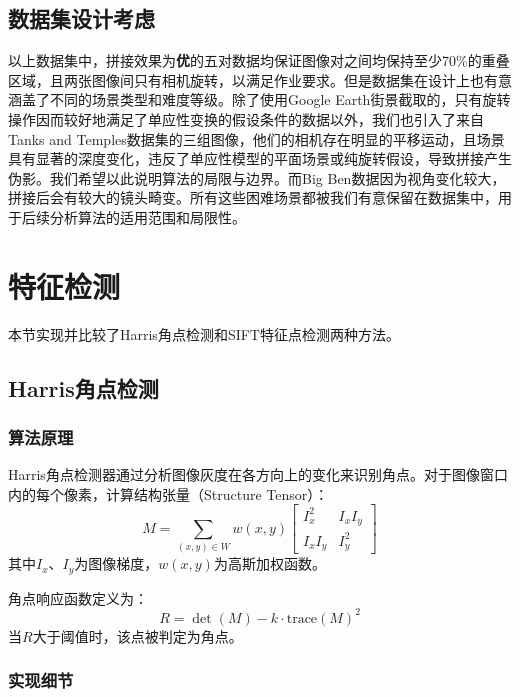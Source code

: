 \documentclass[12pt]{article}
\begin{document}
\subsection{数据集设计考虑}

以上数据集中，拼接效果为\textbf{优}的五对数据均保证图像对之间均保持至少70\%的重叠区域，且两张图像间只有相机旋转，以满足作业要求。但是数据集在设计上也有意涵盖了不同的场景类型和难度等级。除了使用Google Earth街景截取的，只有旋转操作因而较好地满足了单应性变换的假设条件的数据以外，我们也引入了来自Tanks and Temples数据集的三组图像，他们的相机存在明显的平移运动，且场景具有显著的深度变化，违反了单应性模型的平面场景或纯旋转假设，导致拼接产生伪影。我们希望以此说明算法的局限与边界。而Big Ben数据因为视角变化较大，拼接后会有较大的镜头畸变。所有这些困难场景都被我们有意保留在数据集中，用于后续分析算法的适用范围和局限性。

\section{特征检测}

本节实现并比较了Harris角点检测和SIFT特征点检测两种方法。

\subsection{Harris角点检测}

\subsubsection{算法原理}

Harris角点检测器通过分析图像灰度在各方向上的变化来识别角点。对于图像窗口内的每个像素，计算结构张量（Structure Tensor）：
\begin{equation}
M = \sum_{(x,y) \in W} w(x,y) \begin{bmatrix} I_x^2 & I_xI_y \\ I_xI_y & I_y^2 \end{bmatrix}
\end{equation}
其中$I_x$、$I_y$为图像梯度，$w(x,y)$为高斯加权函数。

角点响应函数定义为：
\begin{equation}
R = \det(M) - k \cdot \text{trace}(M)^2
\end{equation}
当$R$大于阈值时，该点被判定为角点。

\subsubsection{实现细节}
\end{document}
